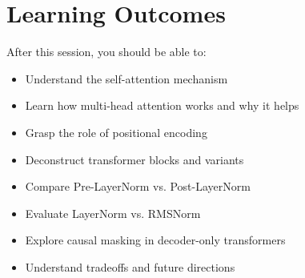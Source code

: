 \section{Learning Outcomes}
\begin{frame}
    After this session, you should be able to:
    \begin{itemize}
        \item Understand the self-attention mechanism
        \item Learn how multi-head attention works and why it helps
        \item Grasp the role of positional encoding
        \item Deconstruct transformer blocks and variants
        \item Compare Pre-LayerNorm vs. Post-LayerNorm
        \item Evaluate LayerNorm vs. RMSNorm
        \item Explore causal masking in decoder-only transformers
        \item Understand tradeoffs and future directions
    \end{itemize}
\end{frame}